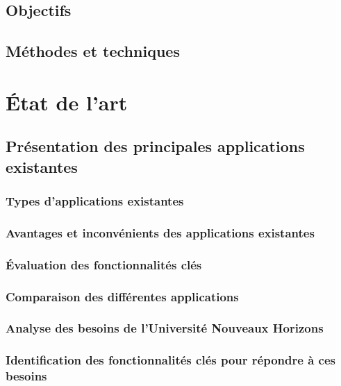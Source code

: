 \documentclass[12pt, a4paper]{report}
\begin{document}
    \section{Objectifs}\label{sec:objectifs}
    \section{Méthodes et techniques}\label{sec:methode}


    \chapter{État de l'art}\label{cha:etat-de-l-art}
    \section{Présentation des principales applications existantes}\label{sec:definitions-et-concepts-cles}
    \subsection{Types d'applications existantes}\label{subsec:types-d-applications-d-aide-a-la-deliberation}
    \subsection{Avantages et inconvénients des applications existantes}\label{subsec:avantages-et-inconvenients-des-applications-existantes}
    \subsection{Évaluation des fonctionnalités clés}\label{subsec:evaluation-des-fonctionnalites-cles}
    \subsection{Comparaison des différentes applications}\label{subsec:comparaison-des-differentes-applications}
    \subsection{Analyse des besoins de l'Université Nouveaux Horizons}\label{subsec:analyse-des-besoins-des-etudiants-de-l-universite-nouveaux-horizons}
    \subsection{Identification des fonctionnalités clés pour répondre à ces besoins}\label{subsec:identification-des-fonctionnalites-cles-pour-repondre-a-ces-besoins}
\end{document}
